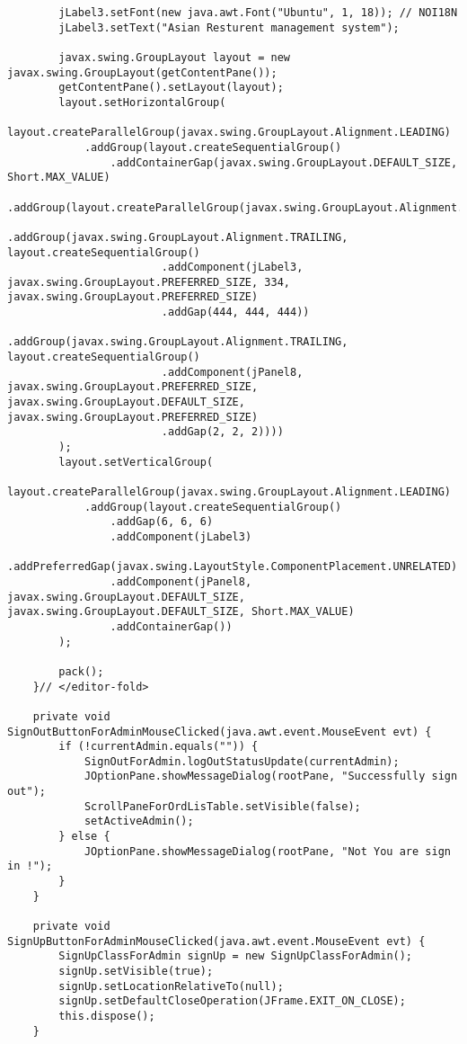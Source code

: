 \documentclass[12pt,a4paper]{article}
\begin{document}
\begin{lstlisting}
        jLabel3.setFont(new java.awt.Font("Ubuntu", 1, 18)); // NOI18N
        jLabel3.setText("Asian Resturent management system");

        javax.swing.GroupLayout layout = new javax.swing.GroupLayout(getContentPane());
        getContentPane().setLayout(layout);
        layout.setHorizontalGroup(
            layout.createParallelGroup(javax.swing.GroupLayout.Alignment.LEADING)
            .addGroup(layout.createSequentialGroup()
                .addContainerGap(javax.swing.GroupLayout.DEFAULT_SIZE, Short.MAX_VALUE)
                .addGroup(layout.createParallelGroup(javax.swing.GroupLayout.Alignment.LEADING)
                    .addGroup(javax.swing.GroupLayout.Alignment.TRAILING, layout.createSequentialGroup()
                        .addComponent(jLabel3, javax.swing.GroupLayout.PREFERRED_SIZE, 334, javax.swing.GroupLayout.PREFERRED_SIZE)
                        .addGap(444, 444, 444))
                    .addGroup(javax.swing.GroupLayout.Alignment.TRAILING, layout.createSequentialGroup()
                        .addComponent(jPanel8, javax.swing.GroupLayout.PREFERRED_SIZE, javax.swing.GroupLayout.DEFAULT_SIZE, javax.swing.GroupLayout.PREFERRED_SIZE)
                        .addGap(2, 2, 2))))
        );
        layout.setVerticalGroup(
            layout.createParallelGroup(javax.swing.GroupLayout.Alignment.LEADING)
            .addGroup(layout.createSequentialGroup()
                .addGap(6, 6, 6)
                .addComponent(jLabel3)
                .addPreferredGap(javax.swing.LayoutStyle.ComponentPlacement.UNRELATED)
                .addComponent(jPanel8, javax.swing.GroupLayout.DEFAULT_SIZE, javax.swing.GroupLayout.DEFAULT_SIZE, Short.MAX_VALUE)
                .addContainerGap())
        );

        pack();
    }// </editor-fold>                        

    private void SignOutButtonForAdminMouseClicked(java.awt.event.MouseEvent evt) {                                                   
        if (!currentAdmin.equals("")) {
            SignOutForAdmin.logOutStatusUpdate(currentAdmin);
            JOptionPane.showMessageDialog(rootPane, "Successfully sign out");
            ScrollPaneForOrdLisTable.setVisible(false);
            setActiveAdmin();
        } else {
            JOptionPane.showMessageDialog(rootPane, "Not You are sign in !");
        }
    }                                                  

    private void SignUpButtonForAdminMouseClicked(java.awt.event.MouseEvent evt) {                                                  
        SignUpClassForAdmin signUp = new SignUpClassForAdmin();
        signUp.setVisible(true);
        signUp.setLocationRelativeTo(null);
        signUp.setDefaultCloseOperation(JFrame.EXIT_ON_CLOSE);
        this.dispose();
    }                                                 


\end{lstlisting}
\end{document}
